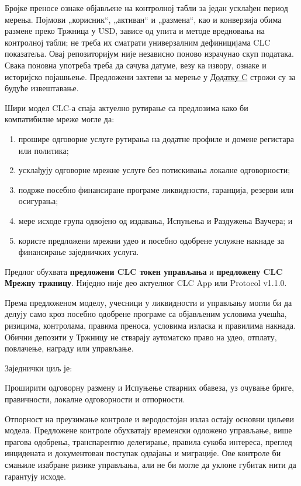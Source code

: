 \documentclass[11pt]{article}
\begin{document}
Бројке преносе ознаке објављене на контролној табли за један усклађен период мерења. Појмови „корисник``, „активан`` и „размена``, као и конверзија обима размене преко Тржница у USD, зависе од упита и методе вредновања на контролној табли; не треба их сматрати универзалним дефиницијама CLC показатеља. Овај репозиторијум није независно поново израчунао скуп података. Свака поновна употреба треба да сачува датуме, везу ка извору, ознаке и историјско појашњење. Предложени захтеви за мерење у \href{https://docs.cosmolocal.credit/sr/white-paper/appendix-c-kpi-definitions}{Додатку C} строжи су за будуће извештавање.

Шири модел CLC-а спаја актуелно рутирање са предлозима како би компатибилне мреже могле да:

\begin{enumerate}[leftmargin=*]
\item прошире одговорне услуге рутирања на додатне профиле и домене регистара или политика;
\item усклађују одговорне мрежне услуге без потискивања локалне одговорности;
\item подрже посебно финансиране програме ликвидности, гаранција, резерви или осигурања;
\item мере исходе група одвојено од издавања, Испуњења и Раздужења Ваучера; и
\item користе предложени мрежни удео и посебно одобрене услужне накнаде за финансирање заједничких услуга.
\end{enumerate}
Предлог обухвата \textbf{предложени CLC токен управљања} и \textbf{предложену CLC Мрежну тржницу}. Ниједно није део актуелног CLC App или Protocol v1.1.0.

Према предложеном моделу, учесници у ликвидности и управљању могли би да делују само кроз посебно одобрене програме са објављеним условима учешћа, ризицима, контролама, правима преноса, условима изласка и правилима накнада. Обични депозити у Тржницу не стварају аутоматско право на удео, отплату, повлачење, награду или управљање.

Заједнички циљ је:

Проширити одговорну размену и Испуњење стварних обавеза, уз очување бриге, правичности, локалне одговорности и отпорности.

Отпорност на преузимање контроле и веродостојан излаз остају основни циљеви модела. Предложене контроле обухватају временски одложено управљање, више прагова одобрења, транспарентно делегирање, правила сукоба интереса, преглед инцидената и документован поступак одвајања и миграције. Ове контроле би смањиле изабране ризике управљања, али не би могле да уклоне губитак нити да гарантују исходе.
\end{document}
